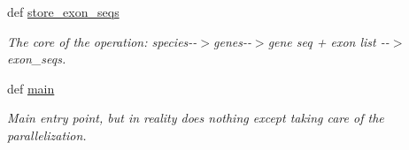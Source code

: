 \begin{DoxyCompactItemize}
def \hyperlink{namespace12__exon__seq__store_a60046448e48836673785b159fbe34282}{store\-\_\-exon\-\_\-seqs}
\begin{DoxyCompactList}\small\item\em The core of the operation\-: species-\/-\/$>$genes-\/-\/$>$gene seq + exon list -\/-\/$>$ exon\-\_\-seqs. \end{DoxyCompactList}\item 
def \hyperlink{namespace12__exon__seq__store_a8517b3ef4d3826fd5ed3ee3b1bf8d539}{main}
\begin{DoxyCompactList}\small\item\em Main entry point, but in reality does nothing except taking care of the parallelization. \end{DoxyCompactList}\end{DoxyCompactItemize}


